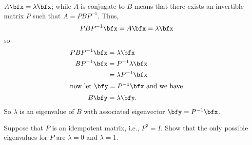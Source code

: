 \begin{questions}
\begin{solution}
    $A\bfx=\lambda\bfx$; while $A$ is conjugate to $B$ means that there
    exists an invertible matrix $P$ such that $A=PBP^{-1}$. Thus,
    \[
      PBP^{-1}\bfx=A\bfx=\lambda\bfx
    \]
    so
    \begin{align*}
      PBP^{-1}\bfx
      &=\lambda\bfx\\
      BP^{-1}\bfx&=P^{-1}\lambda\bfx\\
      &=\lambda P^{-1}\bfx\\
      \intertext{now let $\bfy=P^{-1}\bfx$ and we have}
      B\bfy&=\lambda\bfy.
    \end{align*}
    So $\lambda$ is an eigenvalue of $B$ with associated eigenvector
    $\bfy=P^{-1}\bfx$.
  \end{solution}
  \question[8] Suppose that $P$ is an idempotent matrix, i.e., $P^2=I$. Show
  that the only possible eigenvalues for $P$ are $\lambda=0$ and $\lambda=1$.
\end{questions}
